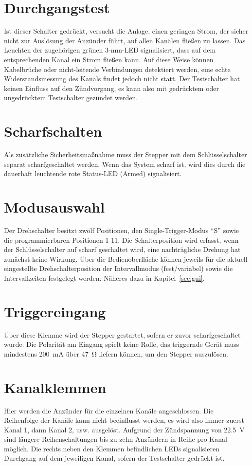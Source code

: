\documentclass[paper=a4, open=any]{scrbook}
\begin{document}
		\section{Durchgangstest}

			Ist dieser Schalter gedrückt, versucht die Anlage, einen geringen Strom, der sicher nicht zur Auslösung der Anzünder führt, auf allen Kanälen fließen zu lassen. Das Leuchten der zugehörigen grünen 3-mm-LED signalisiert, dass auf dem entsprechenden Kanal ein Strom fließen kann. Auf diese Weise können Kabelbrüche oder nicht-leitende Verbindungen detektiert werden, eine echte Widerstandsmessung des Kanals findet jedoch nicht statt. Der Testschalter hat keinen Einfluss auf den Zündvorgang, es kann also mit gedrücktem oder ungedrücktem Testschalter gezündet werden.

		\section{Scharfschalten}

			Als zusätzliche Sicherheitsmaßnahme muss der Stepper mit dem Schlüsselschalter separat scharfgeschaltet werden. Wenn das System scharf ist, wird dies durch die dauerhaft leuchtende rote Status-LED (Armed) signalisiert.

		\section{Modusauswahl}
			Der Drehschalter besitzt zwölf Positionen, den Single-Trigger-Modus \enquote{S} sowie die programmierbaren Positionen 1-11. Die Schalterposition wird erfasst, wenn der Schlüsselschalter auf scharf geschaltet wird, eine nachträgliche Drehung hat zunächst keine Wirkung. Über die Bedienoberfläche können jeweils für die aktuell eingestellte Drehschalterposition der Intervallmodus (fest/variabel) sowie die Intervallzeiten festgelegt werden. Näheres dazu in Kapitel~\ref{sec:gui}.

		\section{Triggereingang}
			Über diese Klemme wird der Stepper gestartet, sofern er zuvor scharfgeschaltet wurde. Die Polarität am Eingang spielt keine Rolle, das triggernde Gerät muss mindestens \SI{200}{\milli\ampere} über \SI{47}{\ohm} liefern können, um den Stepper auszulösen.

		\section{Kanalklemmen}
			Hier werden die Anzünder für die einzelnen Kanäle angeschlossen. Die Reihenfolge der Kanäle kann nicht beeinflusst werden, es wird also immer zuerst Kanal 1, dann Kanal 2, usw. ausgelöst. Aufgrund der Zündspannung von \SI{22,5}{\volt} sind längere Reihenschaltungen bis zu zehn Anzündern in Reihe pro Kanal möglich. Die rechts neben den Klemmen befindlichen LEDs signalisieren Durchgang auf dem jeweiligen Kanal, sofern der Testschalter gedrückt ist.
\end{document}
